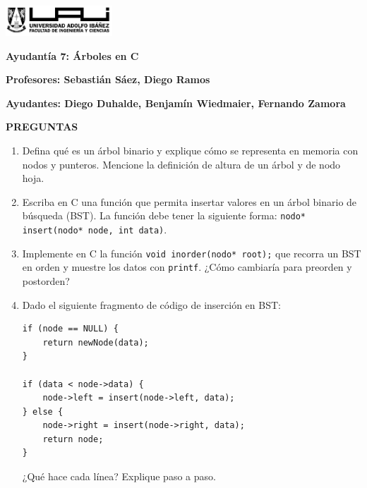 \documentclass[12pt]{article}
\begin{document}
    \begin{titlepage}
        \centering
        \includegraphics[width=0.3\textwidth]{../imgs/logo-uai-fic.png}

        \vspace{0.5cm}
        \textbf{\fontsize{12}{24} Ayudantía 7: Árboles en C}

        \vspace{0.5cm}
        \textbf{\fontsize{12}{24}\selectfont Profesores: Sebastián Sáez, Diego Ramos}

        \begin{center}
            \textbf{\fontsize{12}{24}\selectfont Ayudantes: Diego Duhalde, Benjamín Wiedmaier, Fernando Zamora}
        \end{center}
        \begin{center}
            \textbf{PREGUNTAS}
        \end{center}
        
        \begin{enumerate}[leftmargin=*]
            \item Defina qué es un árbol binario y explique cómo se representa en memoria con nodos y punteros. Mencione la definición de altura de un árbol y de nodo hoja.
            
            \item Escriba en C una función que permita insertar valores en un árbol binario de búsqueda (BST). La función debe tener la siguiente forma: \texttt{nodo* insert(nodo* node, int data)}.
            
            \item Implemente en C la función \texttt{void inorder(nodo* root);} que recorra un BST en orden y muestre los datos con \texttt{printf}. ¿Cómo cambiaría para preorden y postorden?
            
            \item Dado el siguiente fragmento de código de inserción en BST:
            \begin{lstlisting}
if (node == NULL) {
    return newNode(data);
}

if (data < node->data) {
    node->left = insert(node->left, data);
} else {
    node->right = insert(node->right, data);
    return node;
}
            \end{lstlisting}
            ¿Qué hace cada línea? Explique paso a paso.
            

\end{enumerate}
\end{titlepage}
\end{document}
